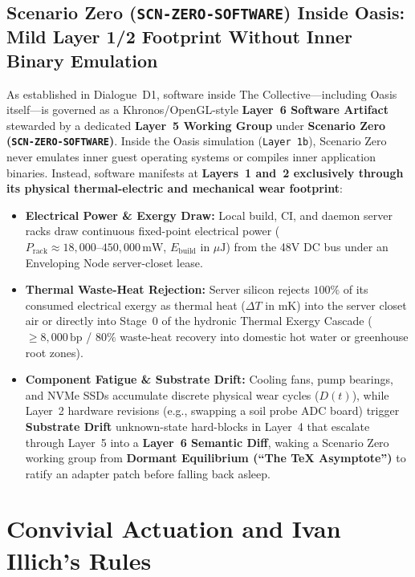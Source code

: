 \subsection{Scenario Zero (\texttt{SCN-ZERO-SOFTWARE}) Inside Oasis: Mild Layer 1/2 Footprint Without Inner Binary Emulation}
\label{subsec:ch07_scenario_zero_footprint}
As established in Dialogue~D1, software inside The Collective---including Oasis itself---is governed as a Khronos/OpenGL-style \textbf{Layer~6 Software Artifact} stewarded by a dedicated \textbf{Layer~5 Working Group} under \textbf{Scenario Zero (\texttt{SCN-ZERO-SOFTWARE})}. Inside the Oasis simulation (\texttt{Layer 1b}), Scenario Zero never emulates inner guest operating systems or compiles inner application binaries. Instead, software manifests at \textbf{Layers~1 and~2 exclusively through its physical thermal-electric and mechanical wear footprint}:
\begin{itemize}
    \item \textbf{Electrical Power \& Exergy Draw:} Local build, CI, and daemon server racks draw continuous fixed-point electrical power ($P_{\mathrm{rack}} \approx 18{,}000\text{--}450{,}000\,\mathrm{mW}$, $E_{\mathrm{build}}$ in $\mu\mathrm{J}$) from the 48V DC bus under an Enveloping Node server-closet lease.
    \item \textbf{Thermal Waste-Heat Rejection:} Server silicon rejects $100\%$ of its consumed electrical exergy as thermal heat ($\Delta T$ in $\mathrm{mK}$) into the server closet air or directly into Stage~0 of the hydronic Thermal Exergy Cascade ($\ge 8{,}000\,\mathrm{bp}$ / $80\%$ waste-heat recovery into domestic hot water or greenhouse root zones).
    \item \textbf{Component Fatigue \& Substrate Drift:} Cooling fans, pump bearings, and NVMe SSDs accumulate discrete physical wear cycles ($D(t)$), while Layer~2 hardware revisions (e.g., swapping a soil probe ADC board) trigger \textbf{Substrate Drift} unknown-state hard-blocks in Layer~4 that escalate through Layer~5 into a \textbf{Layer~6 Semantic Diff}, waking a Scenario Zero working group from \textbf{Dormant Equilibrium (``The TeX Asymptote'')} to ratify an adapter patch before falling back asleep.
\end{itemize}

\section{Convivial Actuation and Ivan Illich's Rules}

